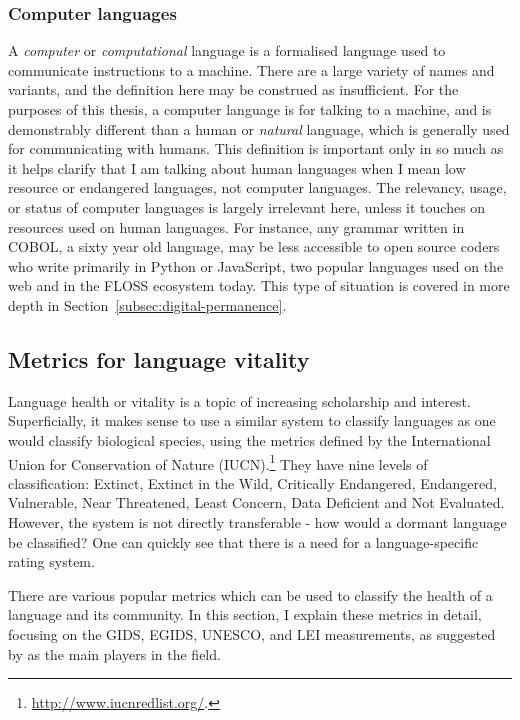 \subsubsection{Computer languages}

A \textit{computer} or \textit{computational} language is a formalised language used to communicate instructions to a machine. There are a large variety of names and variants, and the definition here may be construed as insufficient. For the purposes of this thesis, a computer language is for talking to a machine, and is demonstrably different than a human or \textit{natural} language, which is generally used for communicating with humans. This definition is important only in so much as it helps clarify that I am talking about human languages when I mean low resource or endangered languages, not computer languages. The relevancy, usage, or status of computer languages is largely irrelevant here, unless it touches on resources used on human languages. For instance, any grammar written in COBOL, a sixty year old language, may be less accessible to open source coders who write primarily in Python or JavaScript, two popular languages used on the web and in the FLOSS ecosystem today. This type of situation is covered in more depth in Section~\ref{subsec:digital-permanence}.

\subsection{Metrics for language vitality}
\label{subsec:metrics}

Language health or vitality is a topic of increasing scholarship and interest. Superficially, it makes sense to use a similar system to classify languages as one would classify biological species, using the metrics defined by the International Union for Conservation of Nature (IUCN).\footnote{\href{http://www.iucnredlist.org/}{http://www.iucnredlist.org/}. } They have nine levels of classification: Extinct, Extinct in the Wild, Critically Endangered, Endangered, Vulnerable, Near Threatened, Least Concern, Data Deficient and Not Evaluated. However, the system is not directly transferable - how would a dormant language be classified? One can quickly see that there is a need for a language-specific rating system.

There are various popular metrics which can be used to classify the health of a language and its community. In this section, I explain these metrics in detail, focusing on the GIDS, EGIDS, UNESCO, and LEI measurements, as suggested by \citet{yang2017toward} as the main players in the field.


